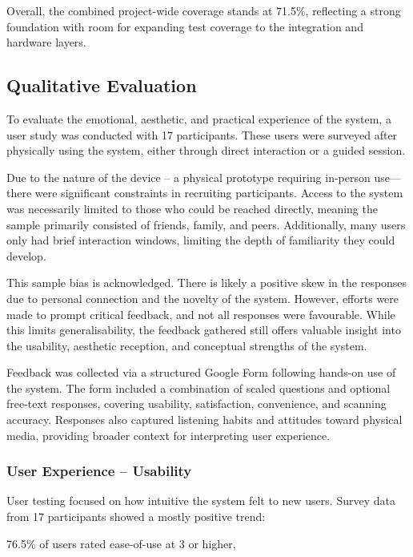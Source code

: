                 Overall, the combined project-wide coverage stands at 71.5\%, reflecting a strong foundation with room for expanding test coverage to the integration and hardware layers.
    
        \subsection{Qualitative Evaluation}
    
            To evaluate the emotional, aesthetic, and practical experience of the system, a user study was conducted with 17 participants. These users were surveyed after physically using the system, either through direct interaction or a guided session.
    
            Due to the nature of the device -- a physical prototype requiring in-person use—there were significant constraints in recruiting participants. Access to the system was necessarily limited to those who could be reached directly, meaning the sample primarily consisted of friends, family, and peers. Additionally, many users only had brief interaction windows, limiting the depth of familiarity they could develop.
            
            This sample bias is acknowledged. There is likely a positive skew in the responses due to personal connection and the novelty of the system. However, efforts were made to prompt critical feedback, and not all responses were favourable. While this limits generalisability, the feedback gathered still offers valuable insight into the usability, aesthetic reception, and conceptual strengths of the system.
    
            Feedback was collected via a structured Google Form following hands-on use of the system. The form included a combination of scaled questions and optional free-text responses, covering usability, satisfaction, convenience, and scanning accuracy. Responses also captured listening habits and attitudes toward physical media, providing broader context for interpreting user experience.
        
            \subsubsection{User Experience -- Usability}
                User testing focused on how intuitive the system felt to new users. Survey data from 17 participants showed a mostly positive trend:
                
                    76.5\% of users rated ease-of-use at 3 or higher,
                
